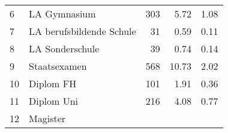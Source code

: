 \begin{longtable}{lXrrr}
     6 &
     \multicolumn{1}{X}{ LA Gymnasium   } &


       \num{303} &
       \num[round-mode=places,round-precision=2]{5.72} &
         \num[round-mode=places,round-precision=2]{1.08} \\

     7 &
     \multicolumn{1}{X}{ LA berufsbildende Schule   } &


       \num{31} &
       \num[round-mode=places,round-precision=2]{0.59} &
         \num[round-mode=places,round-precision=2]{0.11} \\

     8 &
     \multicolumn{1}{X}{ LA Sonderschule   } &


       \num{39} &
       \num[round-mode=places,round-precision=2]{0.74} &
         \num[round-mode=places,round-precision=2]{0.14} \\

     9 &
     \multicolumn{1}{X}{ Staatsexamen   } &


       \num{568} &
       \num[round-mode=places,round-precision=2]{10.73} &
         \num[round-mode=places,round-precision=2]{2.02} \\

     10 &
     \multicolumn{1}{X}{ Diplom FH   } &


       \num{101} &
       \num[round-mode=places,round-precision=2]{1.91} &
         \num[round-mode=places,round-precision=2]{0.36} \\

     11 &
     \multicolumn{1}{X}{ Diplom Uni   } &


       \num{216} &
       \num[round-mode=places,round-precision=2]{4.08} &
         \num[round-mode=places,round-precision=2]{0.77} \\

     12 &
     \multicolumn{1}{X}{ Magister   } &



\end{longtable}
